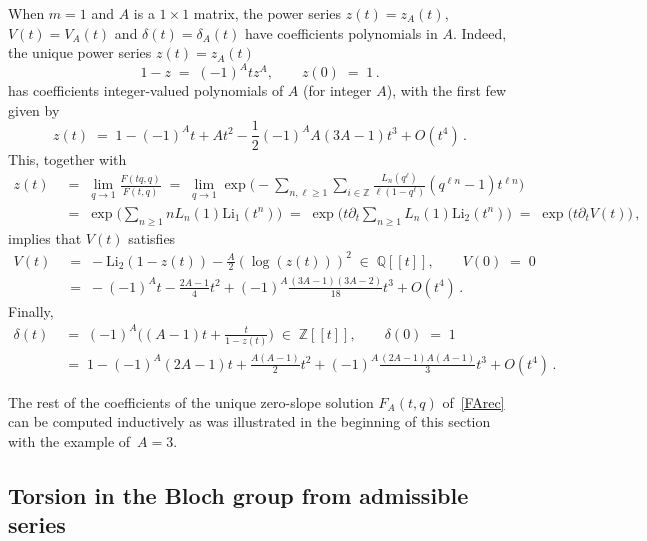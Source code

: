 \documentclass[12pt,reqno]{amsart}
\theoremstyle{definition}
\def\BZ{\mathbb Z}
\def\BQ{\mathbb Q}
\def\Li{\mathrm{Li}}
\def\be{\begin{equation}}
\def\ee{\end{equation}}
\def\={\;=\;}
\def\inn{\;\in\;}
\begin{document}
When $m=1$ and $A$ is a $1 \times 1$ matrix, the power series $z(t)=z_A(t)$,
$V(t)=V_A(t)$ and $\delta(t)=\delta_A(t)$ have coefficients polynomials in $A$.
Indeed, the unique power series $z(t)=z_A(t)$ 
\be
\label{gAdef}
1-z\=(-1)^A t z^A, \qquad z(0)\=1 \,.
\ee
has coefficients integer-valued polynomials of $A$ (for integer $A$), with the
first few given by
\be
\label{fewgt}
z(t) \= 1- (-1)^{A} t + A t^2 - \frac{1}{2}(-1)^{A} A(3A-1) t^3 + O(t^4) \,.
\ee
This, together with 
\begin{align*}
z(t) & \= \lim_{q \to 1} \frac{F(tq,q)}{F(t,q)} \= \lim_{q \to 1}
\exp\Big(-\sum_{n, \ell \geq 1} \sum_{i \in \BZ} \frac{L_n(q^\ell)}{\ell(1-q^\ell)}
(q^{\ell n}-1) t^{\ell n} \Big)
\\
& \= \exp\big( \sum_{n \geq 1} n L_n(1) \Li_1(t^n) \big)
\= \exp\big( t \partial_t \sum_{n \geq 1} L_n(1) \Li_2(t^n) \big)
\= \exp\big( t \partial_t V(t) \big)\,,
\end{align*}
implies that $V(t)$ satisfies 
\be 
\label{g2V}
\begin{aligned}
V(t) 
& \= -\Li_2(1-z(t)) - \frac{A}{2} (\log(z(t)))^2 \inn \BQ[\![t]\!],
\qquad V(0)\=0 \\
& \= -(-1)^A t -\frac{2A-1}{4} t^2 + (-1)^A \frac{(3A-1)(3A-2)}{18} t^3
+ O(t^4) \,.
\end{aligned}
\ee
Finally,
\be
\label{deltadef}
\begin{aligned}
\delta(t) & \= (-1)^A \Big( (A-1)t + \frac{t}{1-z(t)} \Big) \inn \BZ[\![t]\!],
\qquad \delta(0)\=1 \\
& \=
1 - (-1)^A (2A-1) t + \frac{A(A-1)}{2} t^2 + (-1)^A \frac{(2A-1)A(A-1)}{3} t^3
+ O(t^4) \,.
\end{aligned}
\ee


The rest of the coefficients of the unique zero-slope solution $F_A(t,q)$
of~\eqref{FArec} can be computed inductively as was illustrated in the beginning
of this section with the example of~$A=3$. 

\subsection{Torsion in the Bloch group from admissible series}
\label{sub.8554}
\end{document}
